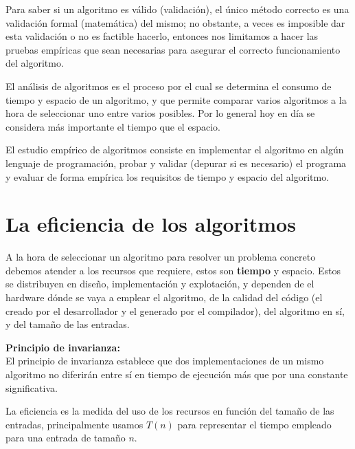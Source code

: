 \documentclass[a4paper, 11pt]{article}
\begin{document}
Para saber si un algoritmo es válido (validación), el único método correcto es una validación formal (matemática) del mismo; no obstante, a veces es imposible dar esta validación o no es factible hacerlo, entonces nos limitamos a hacer las pruebas empíricas que sean necesarias para asegurar el correcto funcionamiento del algoritmo. 

El análisis de algoritmos es el proceso por el cual se determina el consumo de tiempo y espacio de un algoritmo, y que permite comparar varios algoritmos a la hora de seleccionar uno entre varios posibles. Por lo general hoy en día se considera más importante el tiempo que el espacio.

El estudio empírico de algoritmos consiste en implementar el algoritmo en algún lenguaje de programación, probar y validar (depurar si es necesario) el programa y evaluar de forma empírica los requisitos de tiempo y espacio del algoritmo. 

\pagebreak
\section{La eficiencia de los algoritmos}
A la hora de seleccionar un algoritmo para resolver un problema concreto debemos atender a los recursos que requiere, estos son \textbf{tiempo} y espacio. Estos se distribuyen en diseño, implementación y explotación, y dependen de el hardware dónde se vaya a emplear el algoritmo, de la calidad del código (el creado por el desarrollador y el generado por el compilador), del algoritmo en sí, y del tamaño de las entradas. 

\textbf{\large{Principio de invarianza:}}\\
El principio de invarianza establece que dos implementaciones de un mismo algoritmo no diferirán entre sí en tiempo de ejecución más que por una constante significativa.

La eficiencia es la medida del uso de los recursos en función del tamaño de las entradas, principalmente usamos $T(n)$ para representar el tiempo empleado para una entrada de tamaño $n$. 
\end{document}
